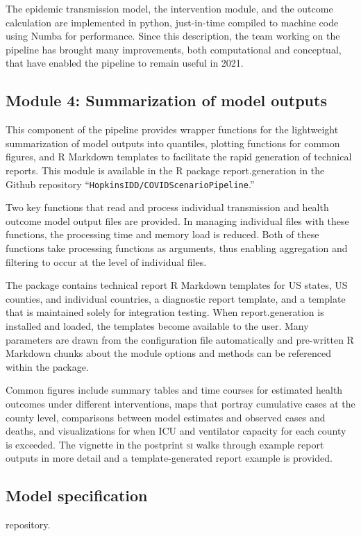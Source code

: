 {The epidemic transmission model, the intervention module, and the outcome calculation are implemented in python, just-in-time compiled to machine code using Numba\cite{Lam:NumbaLLVMbasedPython:2015} for performance. Since this description, the team working on the pipeline has brought many improvements, both computational and conceptual, that have enabled the pipeline to remain useful in 2021.

\subsection{Module 4: Summarization of model outputs}
This component of the pipeline provides wrapper functions for the lightweight summarization of model outputs into quantiles, plotting functions for common figures, and R Markdown templates to facilitate the rapid generation of technical reports. This module is available in the R package report.generation in the Github repository “\verb|HopkinsIDD/COVIDScenarioPipeline|.”

Two key functions that read and process individual transmission and health outcome model output files are provided. In managing individual files with these functions, the processing time and memory load is reduced. Both of these functions take processing functions as arguments, thus enabling aggregation and filtering to occur at the level of individual files.

The package contains technical report R Markdown templates for US states, US counties, and individual countries, a diagnostic report template, and a template that is maintained solely for integration testing. When report.generation is installed and loaded, the templates become available to the user. Many parameters are drawn from the configuration file automatically and pre-written R Markdown chunks about the module options and methods can be referenced within the package.

Common figures include summary tables and time courses for estimated health outcomes under different interventions, maps that portray cumulative cases at the county level, comparisons between model estimates and observed cases and deaths, and visualizations for when ICU and ventilator capacity for each county is exceeded. The vignette in the postprint \textsc{si} walks through example report outputs in more detail and a template-generated report example is provided.

\subsection{Model specification}
 repository.}
